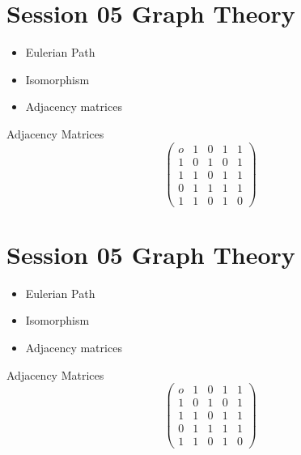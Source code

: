 
\section*{Session 05 Graph Theory}
\begin{itemize}
\item Eulerian Path
\item Isomorphism
\item Adjacency matrices
\end{itemize}
Adjacency Matrices
\[ \left( \begin{matrix}
o & 1 & 0 & 1 & 1 \\ 
1 & 0 & 1 & 0 & 1 \\ 
1 & 1 & 0 & 1 & 1 \\ 
0 & 1 & 1 & 1 & 1 \\ 
1 & 1 & 0 & 1 & 0
\end{matrix} \right) \]


\section*{Session 05 Graph Theory}
\begin{itemize}
\item Eulerian Path
\item Isomorphism
\item Adjacency matrices
\end{itemize}
Adjacency Matrices
\[ \left( \begin{matrix}
o & 1 & 0 & 1 & 1 \\ 
1 & 0 & 1 & 0 & 1 \\ 
1 & 1 & 0 & 1 & 1 \\ 
0 & 1 & 1 & 1 & 1 \\ 
1 & 1 & 0 & 1 & 0
\end{matrix} \right) \]





